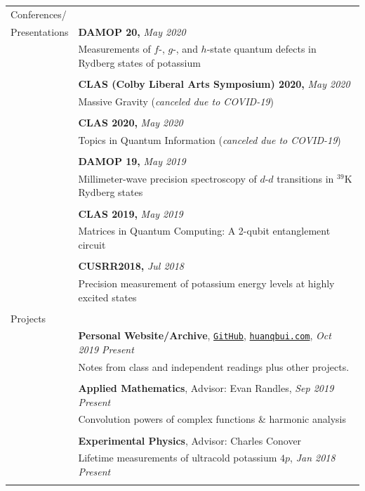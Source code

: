 \documentclass[10pt]{article}
\begin{document}
\begin{longtable}{ l p{14.5cm}   }
     					
\large{Conferences/}   	& \\
\large{Presentations}	& \textbf{DAMOP 20,} \textit{May 2020}\\
	& Measurements of $f$-, $g$-, and $h$-state quantum defects in Rydberg states of potassium\\
	&\\
	& \textbf{CLAS (Colby Liberal Arts Symposium) 2020,} \textit{May 2020}\\
	& Massive Gravity (\textit{canceled due to COVID-19})\\
	& \\
	& \textbf{CLAS 2020,} \textit{May 2020}\\
	& Topics in Quantum Information (\textit{canceled due to COVID-19})\\
	& \\
	& \textbf{DAMOP 19,} \textit{May 2019} \\
	& Millimeter-wave precision spectroscopy of $d$-$d$ transitions in $^{\text{39}}$K Rydberg states\\
	& \\
	& \textbf{CLAS 2019,} \textit{May 2019}\\
	& Matrices in Quantum Computing: A 2-qubit entanglement circuit\\
	&\\
	& \textbf{CUSRR2018,} \textit{Jul 2018}\\
	& Precision measurement of potassium energy levels at highly excited states\\
	& \\ 
	
	
	\large{Projects}		& \\ 
	& \textbf{Personal Website/Archive}, \href{https://github.com/huanium/huanium}{\texttt{GitHub}},  \href{https://huanqbui.com}{\texttt{huanqbui.com}}, \textit{Oct 2019 \textendash Present} \\
	& Notes from class and independent readings plus other projects.\\
	& \\
		
	& \textbf{Applied Mathematics}, Advisor: Evan Randles, \textit{Sep 2019 \textendash Present}\\
	& Convolution powers of complex functions \& harmonic analysis\\
	& \\
	
	& \textbf{Experimental Physics}, Advisor: Charles Conover \\
	& Lifetime measurements of ultracold potassium $4p$, \textit{Jan 2018 \textendash Present}\\
	& \\
	

\end{longtable}
\end{document}
